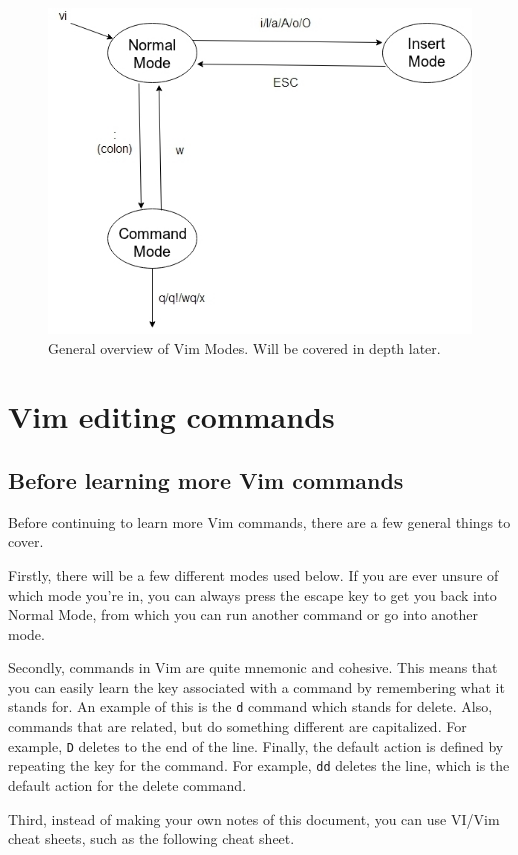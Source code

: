 \documentclass[11pt]{article}
\begin{document}
\begin{figure}[htbp]
\centering
\includegraphics[width=.9\linewidth]{./modes.jpg}
\caption{\label{fig:orgdb1660a}
General overview of Vim Modes. Will be covered in depth later.}
\end{figure}
\section{Vim editing commands}
\label{sec:org42faf20}
\subsection{Before learning more Vim commands}
\label{sec:org18c2bb8}
Before continuing to learn more Vim commands, there are a few general things
to cover. 

Firstly, there will be a few different modes used below. If you are
ever unsure of which mode you're in, you can always press the escape key to 
get you back into Normal Mode, from which you can run another command or 
go into another mode.

Secondly, commands in Vim are quite mnemonic and cohesive. This means that you
can easily learn the key associated with a command by remembering what it stands
for. An example of this is the \texttt{d} command which stands for delete. Also,
commands that are related, but do something different are capitalized. For
example, \texttt{D} deletes to the end of the line. Finally, the default action is defined by
repeating the key for the command. For example, \texttt{dd} deletes the line, which is
the default action for the delete command. 

Third, instead of making your own notes of this document, you can use VI/Vim 
cheat sheets, such as the following cheat sheet.
\end{document}

